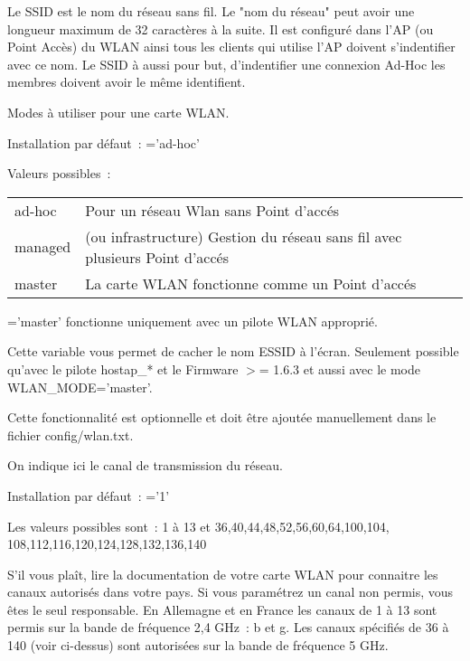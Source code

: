 \begin{description}
      Le SSID est le nom du réseau sans fil. Le "nom du réseau" peut avoir
      une longueur maximum de 32 caractères à la suite. Il est configuré dans
      l'AP (ou Point Accès) du WLAN ainsi tous les clients qui utilise l'AP
      doivent s'indentifier avec ce nom. Le SSID à aussi pour but, d'indentifier
      une connexion Ad-Hoc les membres doivent avoir le même identifient.


      Modes à utiliser pour une carte WLAN.

      Installation par défaut~: ='ad-hoc'

      Valeurs possibles~:

        \begin{tabular}[h]{ll}
            ad-hoc        & Pour un réseau Wlan sans Point d'accés \\
            managed       & (ou infrastructure) Gestion du réseau sans fil avec
            plusieurs Point d'accés \\
            master        & La carte WLAN fonctionne comme un Point d'accés \\
        \end{tabular}

      ='master' fonctionne uniquement avec un pilote WLAN approprié.


      Cette variable vous permet de cacher le nom ESSID à l'écran. Seulement
      possible qu'avec le pilote hostap\_* et le Firmware $>$= 1.6.3 et aussi
      avec le mode WLAN\_MODE='master'.

      Cette fonctionnalité est optionnelle et doit être ajoutée manuellement
      dans le fichier config/wlan.txt.


      On indique ici le canal de transmission du réseau.

      Installation par défaut~: ='1'

      Les valeurs possibles sont~: 1 à 13 et 36,40,44,48,52,56,60,64,100,104,
      108,112,116,120,124,128,132,136,140

      S'il vous plaît, lire la documentation de votre carte WLAN pour connaitre
      les canaux autorisés dans votre pays. Si vous paramétrez un canal non permis,
      vous êtes le seul responsable. En Allemagne et en France les canaux de 1 à 13
      sont permis sur la bande de fréquence 2,4 GHz~: b et g. Les canaux spécifiés
      de 36 à 140 (voir ci-dessus) sont autorisées sur la bande de fréquence 5 GHz.


\end{description}
